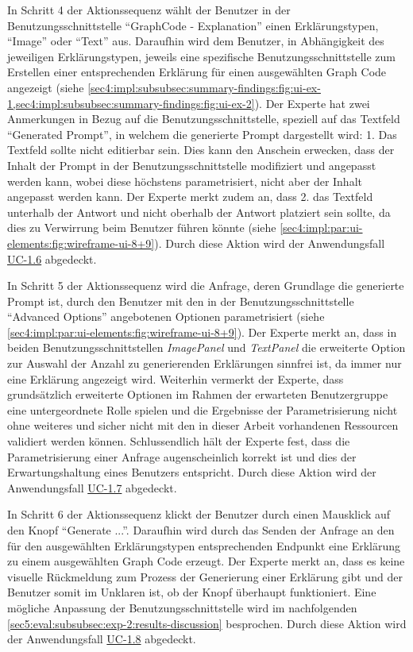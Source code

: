 In Schritt 4 der Aktionssequenz wählt der Benutzer in der Benutzungsschnittstelle \enquote{GraphCode - Explanation} einen Erklärungstypen, \enquote{Image} oder \enquote{Text} aus.
Daraufhin wird dem Benutzer, in Abhängigkeit des jeweiligen Erklärungstypen, jeweils eine spezifische Benutzungsschnittstelle zum Erstellen einer entsprechenden Erklärung für einen ausgewählten Graph Code angezeigt (siehe \cref{sec4:impl:subsubsec:summary-findings:fig:ui-ex-1,sec4:impl:subsubsec:summary-findings:fig:ui-ex-2}).
Der Experte hat zwei Anmerkungen in Bezug auf die Benutzungsschnittstelle, speziell auf das Textfeld \enquote{Generated Prompt}, in welchem die generierte Prompt dargestellt wird:
1. Das Textfeld sollte nicht editierbar sein.
Dies kann den Anschein erwecken, dass der Inhalt der Prompt in der Benutzungsschnittstelle modifiziert und angepasst werden kann, wobei diese höchstens parametrisiert, nicht aber der Inhalt angepasst werden kann.
Der Experte merkt zudem an, dass 2. das Textfeld unterhalb der Antwort und nicht oberhalb der Antwort platziert sein sollte, da dies zu Verwirrung beim Benutzer führen könnte (siehe \cref{sec4:impl:par:ui-elements:fig:wireframe-ui-8+9}).
Durch diese Aktion wird der Anwendungsfall \hyperref[sec3:model:uc-1.6]{UC-1.6} abgedeckt.

In Schritt 5 der Aktionssequenz wird die Anfrage, deren Grundlage die generierte Prompt ist, durch den Benutzer mit den in der Benutzungsschnittstelle \enquote{Advanced Options} angebotenen Optionen parametrisiert (siehe \cref{sec4:impl:par:ui-elements:fig:wireframe-ui-8+9}).
Der Experte merkt an, dass in beiden Benutzungsschnittstellen \textit{ImagePanel} und \textit{TextPanel} die erweiterte Option zur Auswahl der Anzahl zu generierenden Erklärungen sinnfrei ist, da immer nur eine Erklärung angezeigt wird.
Weiterhin vermerkt der Experte, dass grundsätzlich erweiterte Optionen im Rahmen der erwarteten Benutzergruppe eine untergeordnete Rolle spielen und die Ergebnisse der Parametrisierung nicht ohne weiteres und sicher nicht mit den in dieser Arbeit vorhandenen Ressourcen validiert werden können.
Schlussendlich hält der Experte fest, dass die Parametrisierung einer Anfrage augenscheinlich korrekt ist und dies der Erwartungshaltung eines Benutzers entspricht.
Durch diese Aktion wird der Anwendungsfall \hyperref[sec3:model:uc-1.7]{UC-1.7} abgedeckt.

In Schritt 6 der Aktionssequenz klickt der Benutzer durch einen Mausklick auf den Knopf \enquote{Generate ...}.
Daraufhin wird durch das Senden der Anfrage an den für den ausgewählten Erklärungstypen entsprechenden Endpunkt eine Erklärung zu einem ausgewählten Graph Code erzeugt.
Der Experte merkt an, dass es keine visuelle Rückmeldung zum Prozess der Generierung einer Erklärung gibt und der Benutzer somit im Unklaren ist, ob der Knopf überhaupt funktioniert.
Eine mögliche Anpassung der Benutzungsschnittstelle wird im nachfolgenden \cref{sec5:eval:subsubsec:exp-2:results-discussion} besprochen.
Durch diese Aktion wird der Anwendungsfall \hyperref[sec3:model:uc-1.8]{UC-1.8} abgedeckt.

